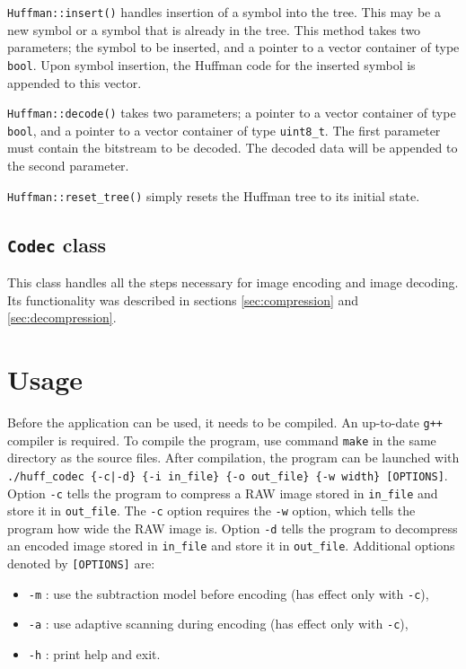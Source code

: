 \documentclass[pdftex, 11pt, a4paper, titlepage]{article}
\newcommand{\code}{\texttt}
\begin{document}
    \code{Huffman::insert()} handles insertion of a symbol into the tree. This may be a new symbol or
    a symbol that is already in the tree. This method takes two parameters; the symbol to be inserted,
    and a pointer to a vector container of type \code{bool}. Upon symbol insertion, the Huffman code for
    the inserted symbol is appended to this vector.

    \code{Huffman::decode()} takes two parameters; a pointer to a vector container of type \code{bool},
    and a pointer to a vector container of type \code{uint8\_t}. The first parameter must contain the
    bitstream to be decoded. The decoded data will be appended to the second parameter.

    \code{Huffman::reset\_tree()} simply resets the Huffman tree to its initial state.

    \subsection{\code{Codec} class}
    This class handles all the steps necessary for image encoding and image decoding. Its functionality
    was described in sections \ref{sec:compression} and \ref{sec:decompression}.

    \section{Usage}
    Before the application can be used, it needs to be compiled. An up-to-date \code{g++} compiler
    is required. To compile the program, use command \code{make} in the same directory as the source files.
    After compilation, the program can be launched with \code{./huff\_codec \{-c|-d\} \{-i in\_file\} \{-o out\_file\} \{-w width\} [OPTIONS]}.
    Option \code{-c} tells the program to compress a RAW image stored in \code{in\_file} and store it in \code{out\_file}.
    The \code{-c} option requires the \code{-w} option, which tells the program how wide the RAW image is.
    Option \code{-d} tells the program to decompress an encoded image stored in \code{in\_file} and store it in \code{out\_file}.
    Additional options denoted by \code{[OPTIONS]} are:
    \begin{itemize}
        \item \code{-m} : use the subtraction model before encoding (has effect only with \code{-c}),
        \item \code{-a} : use adaptive scanning during encoding (has effect only with \code{-c}),
        \item \code{-h} : print help and exit.
    \end{itemize}
\end{document}
